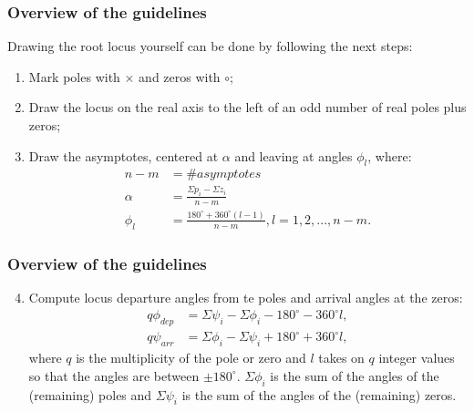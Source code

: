 \begin{frame}
	\frametitle{Overview of the guidelines}
	\begin{block}{}
		Drawing the root locus yourself can be done by following the next steps:
		\vspace{0.5em}
		\begin{enumerate}
			\item Mark poles with $\times$ and zeros with $\circ$;
			\item Draw the locus on the real axis to the left of an odd number of real poles plus zeros;
			\item Draw the asymptotes, centered at $\alpha$ and leaving at angles $\phi_l$, where:
			\vspace{-0.5em}
			\begin{align*}
			n - m &=  \# asymptotes\\
			\alpha &= \frac{\varSigma p_i - \varSigma z_i}{n-m}\\
			\phi_l &= \frac{180^{\circ} + 360^{\circ}(l - 1)}{n - m}, l = 1,2,...,n-m.
			\end{align*}
		\end{enumerate}
	\end{block}
\end{frame}

\begin{frame}
	\frametitle{Overview of the guidelines}
	\begin{block}{}
		\begin{enumerate}
			\setcounter{enumi}{3}
			\item Compute locus departure angles from te poles and arrival angles at the zeros:
			\begin{align*}
			q\phi_{dep} &= \varSigma\psi_i - \varSigma\phi_i - 180^{\circ} - 360^{\circ}l,\\
			q\psi_{arr} &= \varSigma\phi_i - \varSigma\psi_i + 180^{\circ} + 360^{\circ}l,
			\end{align*}
			where $q$ is the multiplicity of the pole or zero and $l$ takes on $q$ integer values so that the angles are between $\pm180^{\circ}$. $\Sigma \phi_i$ is the sum of the angles of the (remaining) poles and $\Sigma \psi_i$ is the sum of the angles of the (remaining) zeros.
		\end{enumerate}
	\end{block}
\end{frame}

